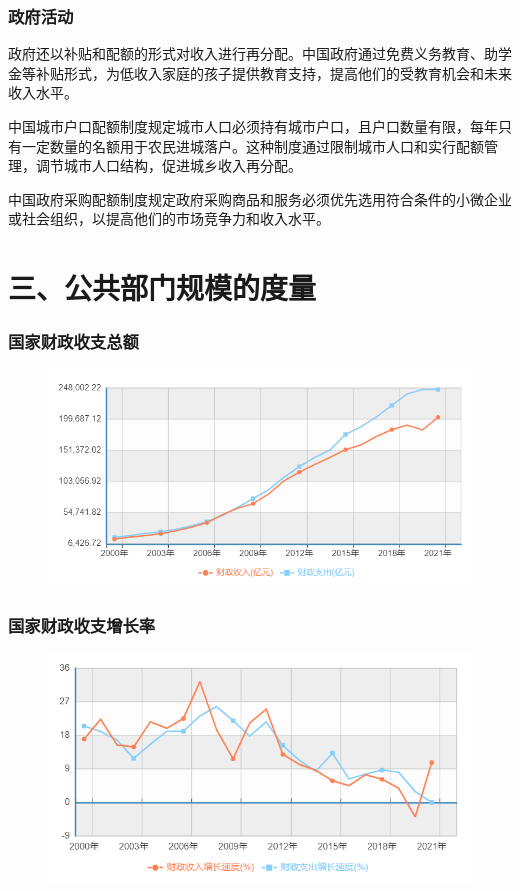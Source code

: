 \documentclass[aspectratio=169, 12pt]{beamer}
\begin{document}
\begin{frame}[plain]
    \frametitle{政府活动}
    政府还以补贴和配额的形式对收入进行再分配。中国政府通过免费义务教育、助学金等补贴形式，为低收入家庭的孩子提供教育支持，提高他们的受教育机会和未来收入水平。
    \par
    中国城市户口配额制度规定城市人口必须持有城市户口，且户口数量有限，每年只有一定数量的名额用于农民进城落户。这种制度通过限制城市人口和实行配额管理，调节城市人口结构，促进城乡收入再分配。
    \par
    中国政府采购配额制度规定政府采购商品和服务必须优先选用符合条件的小微企业或社会组织，以提高他们的市场竞争力和收入水平。
\end{frame}

\section{三、公共部门规模的度量}

\begin{frame}[plain]
    \frametitle{国家财政收支总额}
    \begin{figure}
        \centering
        \includegraphics[width=1.0\textwidth]{./resources/figure/finance.png}
    \end{figure}
\end{frame}

\begin{frame}[plain]
    \frametitle{国家财政收支增长率}
    \begin{figure}
        \centering
        \includegraphics[width=1.0\textwidth]{./resources/figure/finrate.png}
    \end{figure}
\end{frame}
\end{document}
